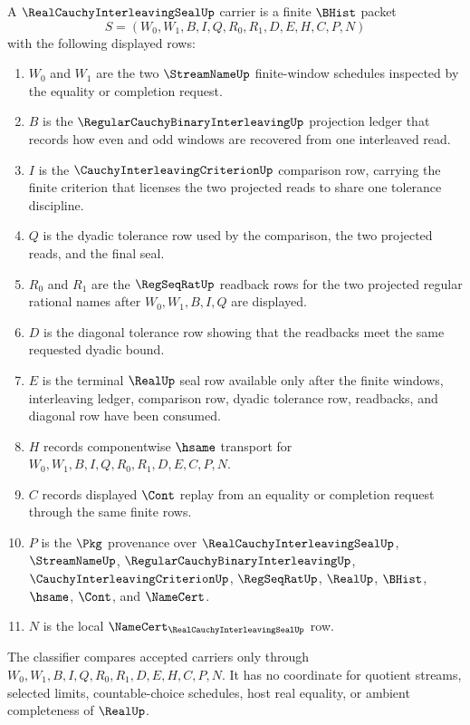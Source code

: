 \begin{definition}
\label{def:real-cauchy-interleaving-seal-carrier}
A $\RealCauchyInterleavingSealUp$ carrier is a finite $\BHist$ packet
$$
S=(W_0,W_1,B,I,Q,R_0,R_1,D,E,H,C,P,N)
$$
with the following displayed rows:
\begin{enumerate}
\item $W_0$ and $W_1$ are the two $\StreamNameUp$ finite-window schedules inspected by the equality or completion request.
\item $B$ is the $\RegularCauchyBinaryInterleavingUp$ projection ledger that records how even and odd windows are recovered from one interleaved read.
\item $I$ is the $\CauchyInterleavingCriterionUp$ comparison row, carrying the finite criterion that licenses the two projected reads to share one tolerance discipline.
\item $Q$ is the dyadic tolerance row used by the comparison, the two projected reads, and the final seal.
\item $R_0$ and $R_1$ are the $\RegSeqRatUp$ readback rows for the two projected regular rational names after $W_0,W_1,B,I,Q$ are displayed.
\item $D$ is the diagonal tolerance row showing that the readbacks meet the same requested dyadic bound.
\item $E$ is the terminal $\RealUp$ seal row available only after the finite windows, interleaving ledger, comparison row, dyadic tolerance row, readbacks, and diagonal row have been consumed.
\item $H$ records componentwise $\hsame$ transport for $W_0,W_1,B,I,Q,R_0,R_1,D,E,C,P,N$.
\item $C$ records displayed $\Cont$ replay from an equality or completion request through the same finite rows.
\item $P$ is the $\Pkg$ provenance over $\RealCauchyInterleavingSealUp$, $\StreamNameUp$, $\RegularCauchyBinaryInterleavingUp$, $\CauchyInterleavingCriterionUp$, $\RegSeqRatUp$, $\RealUp$, $\BHist$, $\hsame$, $\Cont$, and $\NameCert$.
\item $N$ is the local $\NameCert_{\RealCauchyInterleavingSealUp}$ row.
\end{enumerate}
The classifier compares accepted carriers only through $W_0,W_1,B,I,Q,R_0,R_1,D,E,H,C,P,N$. It has no coordinate for quotient streams, selected limits, countable-choice schedules, host real equality, or ambient completeness of $\RealUp$.
\end{definition}

